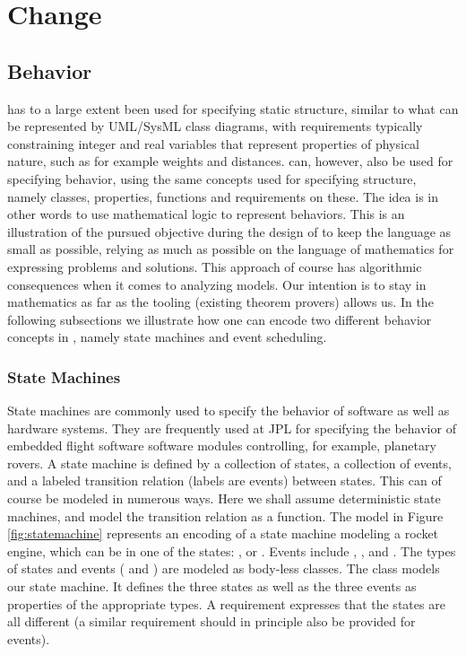 \section{Change}
\label{sec:change}

\subsection{Behavior}

\Klang{} has to a large extent been used for specifying static structure, similar
to what can be represented by UML/SysML class diagrams, with requirements
typically constraining integer and real variables that represent properties of 
physical nature, such as for example weights and distances.
\Klang{} can, however, also be used for specifying behavior, using the same
concepts used for specifying structure, namely classes, properties, functions and
requirements on these. The idea is in other words to use mathematical logic to 
represent behaviors. This is an illustration of the pursued objective during 
the design of \Klang{} to keep the language as small as possible, relying as much 
as possible on the language of mathematics for expressing problems and solutions. 
This approach of course has algorithmic consequences when it comes to analyzing 
models. Our intention is to stay in mathematics as far as the tooling (existing 
theorem provers) allows us. In the following subsections we illustrate how one can 
encode two different behavior concepts in \Klang{}, namely state machines and event 
scheduling.

\subsubsection{State Machines}

State machines are commonly used to specify the behavior of software as well as 
hardware systems. They are frequently used at JPL for specifying the behavior of
embedded flight software software modules controlling, for example, planetary 
rovers. A state machine is defined by a collection of states,
a collection of events, and a labeled transition relation (labels are events) 
between states. This can of course be modeled in numerous ways. Here we shall 
assume deterministic state machines, and model the transition relation as a 
function. 
The \Klang{} model in Figure \ref{fig:statemachine} represents an encoding of a 
state machine modeling a rocket engine, which can be in one of the states:  
,  or . Events include , 
, and . The types of states and events ( and 
) are modeled as body-less classes. The class 
models our state machine. It defines the three states as well as the 
three events as properties of the appropriate types. A requirement expresses that 
the states are all different (a similar requirement should in principle also be 
provided for events).

